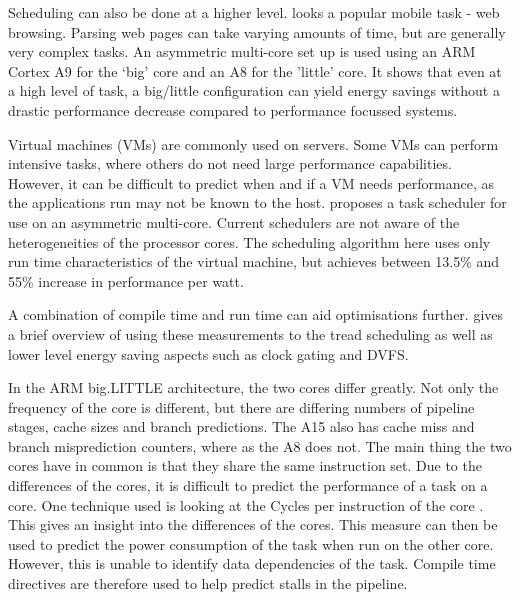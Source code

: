 Scheduling can also be done at a higher level. 
\cite{zhu2013high} looks a popular mobile task - web browsing. 
Parsing web pages can take varying amounts of time, but are generally very complex tasks. 
An asymmetric multi-core set up is used using an ARM Cortex A9 for the `big' core and an A8 for the 'little' core. 
It shows that even at a high level of task, a big/little configuration can yield energy savings without a drastic performance decrease compared to performance focussed systems.

Virtual machines (VMs) are commonly used on servers. 
Some VMs can perform intensive tasks, where others do not need large performance capabilities.
However, it can be difficult to predict when and if a VM needs performance, as the applications run may not be known to the host. 
\cite{wang2012energy} proposes a task scheduler for use on an asymmetric multi-core. 
Current schedulers are not aware of the heterogeneities of the processor cores. 
The scheduling algorithm here uses only run time characteristics of the virtual machine, but achieves between 13.5\% and 55\% increase in performance per watt.

A combination of compile time and run time can aid optimisations further. 
\cite{de2012power} gives a brief overview of using these measurements to the tread scheduling as well as lower level energy saving aspects such as clock gating and DVFS. 


In the ARM big.LITTLE architecture, the two cores differ greatly. 
Not only the frequency of the core is different, but there are differing numbers of pipeline stages, cache sizes and branch predictions.
The A15 also has cache miss and branch misprediction counters, where as the A8 does not. 
The main thing the two cores have in common is that they share the same instruction set. 
Due to the differences of the cores, it is difficult to predict the performance of a task on a core.
One technique used is looking at the Cycles per instruction of the core \cite{pricopi2013power}. 
This gives an insight into the differences of the cores. 
This measure can then be used to predict the power consumption of the task when run on the other core. 
However, this is unable to identify data dependencies of the task. 
Compile time directives are therefore used to help predict stalls in the pipeline. 


